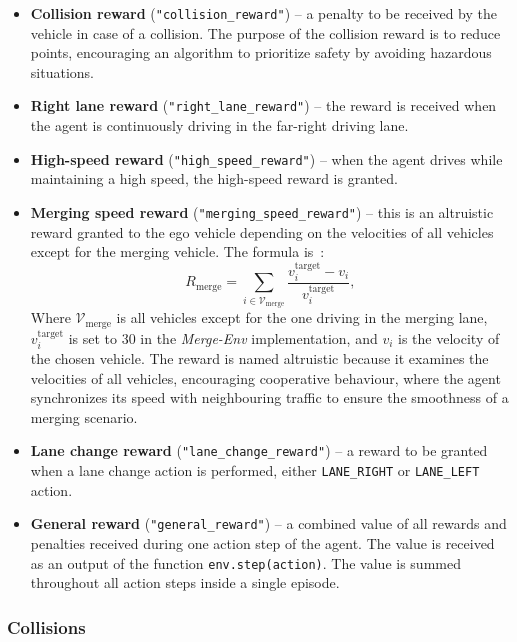 \begin{itemize}
    \item \textbf{Collision reward} (\texttt{"collision\_reward"}) -- a penalty to be received by the vehicle in case of a collision. The purpose of the collision reward is to reduce points, encouraging an algorithm to prioritize safety by avoiding hazardous situations.
    \item \textbf{Right lane reward} (\texttt{"right\_lane\_reward"}) -- the reward is received when the agent is continuously driving in the far-right driving lane.
    \item \textbf{High-speed reward} (\texttt{"high\_speed\_reward"}) -- when the agent drives while maintaining a high speed, the high-speed reward is granted.
    \item \textbf{Merging speed reward} (\texttt{"merging\_speed\_reward"}) -- this is an altruistic reward granted to the ego vehicle depending on the velocities of all vehicles except for the merging vehicle. The formula is~\cite{highway-env}:
    \begin{equation}
 R_{\text{merge}} = \sum_{i \in \mathcal{V}_{\text{merge}}} \frac{v_i^{\text{target}} - v_i}{v_i^{\text{target}}},
        \label{eq:merging_reward}
    \end{equation}
 Where \(\mathcal{V}_{\text{merge}}\) is all vehicles except for the one driving in the merging lane, \(v_i^{\text{target}}\) is set to 30 in the \emph{Merge-Env} implementation, and \(v_i\) is the velocity of the chosen vehicle. The reward is named altruistic because it examines the velocities of all vehicles, encouraging cooperative behaviour, where the agent synchronizes its speed with neighbouring traffic to ensure the smoothness of a merging scenario.
    \item \textbf{Lane change reward} (\texttt{"lane\_change\_reward"}) -- a reward to be granted when a lane change action is performed, either \texttt{LANE\_RIGHT} or \texttt{LANE\_LEFT} action.
    \item \textbf{General reward} (\texttt{"general\_reward"}) -- a combined value of all rewards and penalties received during one action step of the agent. The value is received as an output of the function \texttt{env.step(action)}. The value is summed throughout all action steps inside a single episode.
\end{itemize}

\subsubsection{Collisions}\label{sec:collisions}

